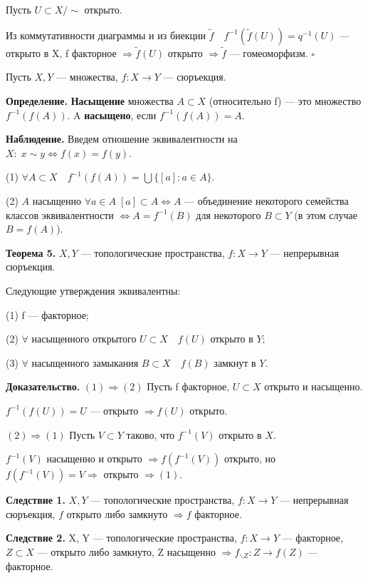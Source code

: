 \documentclass[12pt,a4paper]{article}
\begin{document}
Пусть $U \subset X / \sim$ открыто.

Из коммутативности диаграммы и из биекции $\widetilde{f} \quad f^{-1}(\widetilde{f}(U)) = q^{-1}(U)$ --- открыто в X, f факторное $\Rightarrow \widetilde{f}(U)$ открыто $\Rightarrow \widetilde{f}$ --- гомеоморфизм. $\square$

Пусть $X, Y$ --- множества, $f\!: X \to Y$ --- сюръекция.

\textbf{Определение.} \textbf{Насыщение} множества $A \subset X$ (относительно f) --- это множество $f^{-1}(f(A)).$ A \textbf{насыщено}, если $f^{-1}(f(A)) = A.$

\textbf{Наблюдение.} Введем отношение эквивалентности на $X\!: \; x \sim y \Leftrightarrow f(x) = f(y).$

(1) $\forall A \subset X \quad f^{-1}(f(A)) = \bigcup \{[a]\!: a \in A\}.$

(2) $A$ насыщенно $\forall a \in A \; [a] \subset A \Leftrightarrow A$ --- объединение некоторого семейства классов эквивалентности $\Leftrightarrow A = f^{-1}(B)$ для некоторого $B \subset Y$ (в этом случае $B = f(A)$).

\textbf{Теорема 5.} $X, Y$ --- топологические пространства, $f\!: X \to Y$ --- непрерывная сюръекция.

Следующие утверждения эквивалентны:

(1) f --- факторное;

(2) $\forall$ насыщенного открытого $U \subset X \quad f(U)$ открыто в $Y;$

(3) $\forall$ насыщенного замыкания $B \subset X \quad f(B)$ замкнут в $Y.$

\textbf{Доказательство.} $(1) \Rightarrow (2)$ Пусть f факторное, $U \subset X$ открыто и насыщенно.

$f^{-1}(f(U)) = U$ --- открыто $\Rightarrow f(U)$ открыто.

$(2) \Rightarrow (1)$ Пусть $V \subset Y$ таково, что $f^{-1}(V)$ открыто в $X.$

$f^{-1}(V)$ насыщенно и открыто $\Rightarrow f(f^{-1}(V))$ открыто, но $f(f^{-1}(V)) = V \Rightarrow$ открыто $\Rightarrow (1).$

\textbf{Следствие 1.} $X, Y$ --- топологические пространства, $f\!: X \to Y$ --- непрерывная сюръекция, $f$ открыто либо замкнуто $\Rightarrow f$ факторное.

\textbf{Следствие 2.} X, Y --- топологические пространства, $f\!: X \to Y$ --- факторное, $Z \subset X$ --- открыто либо замкнуто, Z насыщенно $\Rightarrow f_{\backslash Z}\!: Z \to f(Z)$ --- факторное.
\end{document}
